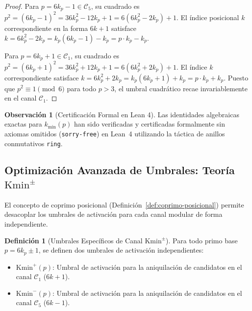 \documentclass{article}
\numberwithin{equation}{section}
\theoremstyle{plain}
\theoremstyle{definition}
\newtheorem{definition}[theorem]{Definición}
\newtheorem{remark}[theorem]{Observación}
\begin{document}
\begin{proof}
Para $p = 6k_p - 1 \in \mathcal{C}_5$, su cuadrado es $p^2 = (6k_p - 1)^2 = 36k_p^2 - 12k_p + 1 = 6(6k_p^2 - 2k_p) + 1$.
El índice posicional $k$ correspondiente en la forma $6k+1$ satisface $k = 6k_p^2 - 2k_p = k_p(6k_p - 1) - k_p = p \cdot k_p - k_p$.

Para $p = 6k_p + 1 \in \mathcal{C}_1$, su cuadrado es $p^2 = (6k_p + 1)^2 = 36k_p^2 + 12k_p + 1 = 6(6k_p^2 + 2k_p) + 1$.
El índice $k$ correspondiente satisface $k = 6k_p^2 + 2k_p = k_p(6k_p + 1) + k_p = p \cdot k_p + k_p$.
Puesto que $p^2 \equiv 1 \pmod 6$ para todo $p > 3$, el umbral cuadrático recae invariablemente en el canal $\mathcal{C}_1$.
\end{proof}

\begin{remark}[Certificación Formal en Lean 4]
\label{rem:certificacion-kmin}
Las identidades algebraicas exactas para $k_{\min}(p)$ han sido verificadas y certificadas formalmente sin axiomas omitidos (\texttt{sorry-free}) en Lean~4 utilizando la táctica de anillos conmutativos \texttt{ring}.
\end{remark}

\subsection{Optimización Avanzada de Umbrales: Teoría $\mathrm{Kmin}^\pm$}

El concepto de coprimo posicional (Definición~\ref{def:coprimo-posicional}) permite desacoplar los umbrales de activación para cada canal modular de forma independiente.

\begin{definition}[Umbrales Específicos de Canal $\mathrm{Kmin}^\pm$]
\label{def:kmin-pm}
Para todo primo base $p = 6k_p \pm 1$, se definen dos umbrales de activación independientes:
\begin{itemize}
    \item $\mathrm{Kmin}^+(p)$: Umbral de activación para la aniquilación de candidatos en el canal $\mathcal{C}_1$ ($6k+1$).
    \item $\mathrm{Kmin}^-(p)$: Umbral de activación para la aniquilación de candidatos en el canal $\mathcal{C}_5$ ($6k-1$).
\end{itemize}
\end{definition}
\end{document}
